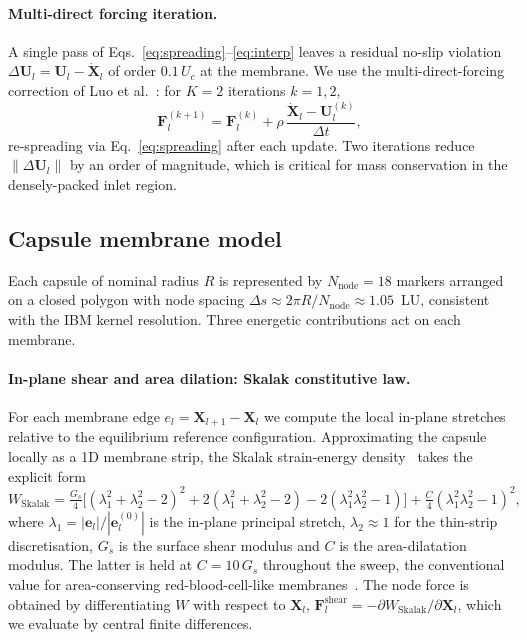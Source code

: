 \documentclass[11pt,a4paper]{article}
\begin{document}
\paragraph{Multi-direct forcing iteration.}
A single pass of Eqs.~\eqref{eq:spreading}--\eqref{eq:interp} leaves
a residual no-slip violation
$\Delta \boldsymbol U_l = \boldsymbol U_l - \dot{\boldsymbol X}_l$
of order $0.1\,U_c$ at the membrane. We use the multi-direct-forcing
correction of Luo et al.~\citep{luo2007full}: for $K = 2$ iterations
$k = 1, 2$,
\begin{equation}
\boldsymbol F_l^{(k+1)} = \boldsymbol F_l^{(k)}
   + \rho\,
     \frac{\dot{\boldsymbol X}_l - \boldsymbol U_l^{(k)}}{\Delta t},
\label{eq:mdf}
\end{equation}
re-spreading via Eq.~\eqref{eq:spreading} after each update. Two
iterations reduce $\|\Delta \boldsymbol U_l\|$ by an order of
magnitude, which is critical for mass conservation in the
densely-packed inlet region.

\subsection{Capsule membrane model}
\label{sec:methods-membrane}

Each capsule of nominal radius $R$ is represented by
$N_{\text{node}} = 18$ markers arranged on a closed polygon with
node spacing
$\Delta s \approx 2\pi R / N_{\text{node}} \approx 1.05$~LU,
consistent with the IBM kernel resolution. Three energetic
contributions act on each membrane.

\paragraph{In-plane shear and area dilation: Skalak constitutive law.}
For each membrane edge $e_l = \boldsymbol X_{l+1} - \boldsymbol X_l$
we compute the local in-plane stretches relative to the equilibrium
reference configuration. Approximating the capsule locally as a 1D
membrane strip, the Skalak strain-energy density~\citep{skalak1973strain}
takes the explicit form
\begin{equation}
W_{\text{Skalak}} = \tfrac{G_s}{4}
     \bigl[(\lambda_1^2 + \lambda_2^2 - 2)^2
            + 2(\lambda_1^2 + \lambda_2^2 - 2)
            - 2(\lambda_1^2 \lambda_2^2 - 1) \bigr]
     + \tfrac{C}{4}(\lambda_1^2 \lambda_2^2 - 1)^2,
  \label{eq:skalak}
\end{equation}
where $\lambda_1 = |\boldsymbol e_l|/|\boldsymbol e_l^{(0)}|$ is the
in-plane principal stretch, $\lambda_2 \approx 1$ for the thin-strip
discretisation, $G_s$ is the surface shear modulus and $C$ is the
area-dilatation modulus. The latter is held at $C = 10\,G_s$
throughout the sweep, the conventional value for area-conserving
red-blood-cell-like membranes~\citep{kruger2017lattice}. The
node force is obtained by differentiating $W$ with respect to
$\boldsymbol X_l$,
$\boldsymbol F_l^{\text{shear}} = -\partial W_{\text{Skalak}}
/ \partial \boldsymbol X_l$, which we evaluate by central finite
differences.
\end{document}
